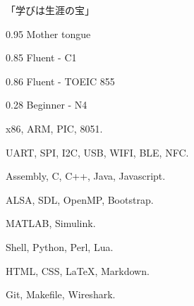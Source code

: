 \documentclass{faresume}
\begin{document}
\begin{column}[\rightcolumnwidth]


		\addcontent
		{
			{\Large\begin{CJK}{UTF8}{min}「学びは生涯の宝」\end{CJK}}
		}{}{}{}{}


		{}{}{}{}

		{}{}{}{}

		{}{}{}{}

		{}{}{}{}

		{}{}{}{}


			{0.95}
			{Mother tongue}
			{}{}{}

			{0.85}
			{Fluent - C1}
			{}{}{}

			{0.86}
			{Fluent - TOEIC 855}
			{}{}{}

			{0.28}
			{Beginner - N4}
			{}{}{}


			{x86, ARM, PIC, 8051.}
			{}{}{}{}

			{UART, SPI, I2C, USB, WIFI, BLE, NFC.}
			{}{}{}{}

			{Assembly, C, C++, Java, Javascript.}
			{}{}{}{}

			{ALSA, SDL, OpenMP, Bootstrap.}
			{}{}{}{}

			{MATLAB, Simulink.}
			{}{}{}{}

			{Shell, Python, Perl, Lua.}
			{}{}{}{}

			{HTML, CSS, {\LaTeX}, Markdown.}
			{}{}{}{}

			{Git, Makefile, Wireshark.}
			{}{}{}{}


\end{column}
\end{document}
